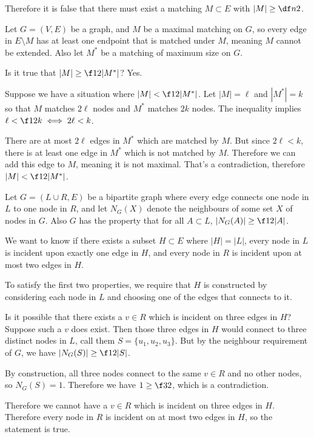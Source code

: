 \documentclass[a4paper]{article}
\begin{document}
Therefore it is false that there must exist a matching $M \subset E$ with $|M| \ge \df n2$.



Let $G = (V, E)$ be a graph, and $M$ be a maximal matching on $G$, so every edge in $E \setminus M$ has at least one endpoint that is matched under $M$, meaning $M$ cannot be extended. Also let $M^*$ be a matching of maximum size on $G$.

Is it true that $|M| \ge \f12 |M^*|$? Yes.

Suppose we have a situation where $|M| < \f12 |M^*|$. Let $|M| = \ell$ and $|M^*| = k$ so that $M$ matches $2\ell$ nodes and $M^*$ matches $2k$ nodes. The inequality implies $\ell < \f12 k \iff 2\ell < k$.

There are at most $2\ell$ edges in $M^*$ which are matched by $M$. But since $2\ell < k$, there is at least one edge in $M^*$ which is not matched by $M$. Therefore we can add this edge to $M$, meaning it is not maximal. That's a contradiction, therefore $|M| < \f12 |M^*|$.



Let $G = (L \cup R, E)$ be a bipartite graph where every edge connects one node in $L$ to one node in $R$, and let $N_G(X)$ denote the neighbours of some set $X$ of nodes in $G$. Also $G$ has the property that for all $A \subset L$, $|N_G(A)| \ge \f12 |A|$.

We want to know if there exists a subset $H \subset E$ where $|H| = |L|$, every node in $L$ is incident upon exactly one edge in $H$, and every node in $R$ is incident upon at most two edges in $H$.

To satisfy the first two properties, we require that $H$ is constructed by considering each node in $L$ and choosing one of the edges that connects to it.

Is it possible that there exists a $v \in R$ which is incident on three edges in $H$? Suppose such a $v$ does exist. Then those three edges in $H$ would connect to three distinct nodes in $L$, call them $S = \{u_1, u_2, u_3\}$. But by the neighbour requirement of $G$, we have $|N_G(S)| \ge \f12 |S|$.

By construction, all three nodes connect to the same $v \in R$ and no other nodes, so $N_G(S) = 1$. Therefore we have $1 \ge \f32$, which is a contradiction.

Therefore we cannot have a $v \in R$ which is incident on three edges in $H$. Therefore every node in $R$ is incident on at most two edges in $H$, so the statement is true.

\end{document}
